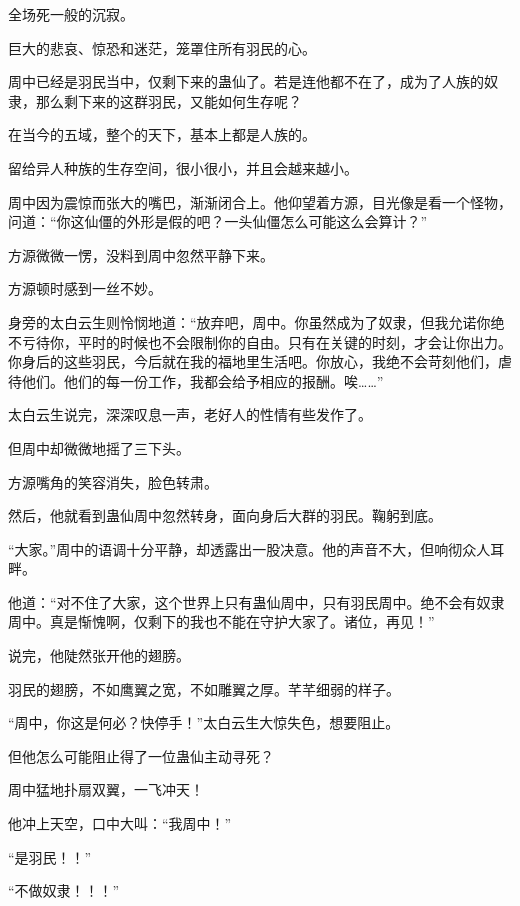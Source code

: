 
\begin{this_body}

全场死一般的沉寂。

巨大的悲哀、惊恐和迷茫，笼罩住所有羽民的心。

周中已经是羽民当中，仅剩下来的蛊仙了。若是连他都不在了，成为了人族的奴隶，那么剩下来的这群羽民，又能如何生存呢？

在当今的五域，整个的天下，基本上都是人族的。

留给异人种族的生存空间，很小很小，并且会越来越小。

周中因为震惊而张大的嘴巴，渐渐闭合上。他仰望着方源，目光像是看一个怪物，问道：“你这仙僵的外形是假的吧？一头仙僵怎么可能这么会算计？”

方源微微一愣，没料到周中忽然平静下来。

方源顿时感到一丝不妙。

身旁的太白云生则怜悯地道：“放弃吧，周中。你虽然成为了奴隶，但我允诺你绝不亏待你，平时的时候也不会限制你的自由。只有在关键的时刻，才会让你出力。你身后的这些羽民，今后就在我的福地里生活吧。你放心，我绝不会苛刻他们，虐待他们。他们的每一份工作，我都会给予相应的报酬。唉……”

太白云生说完，深深叹息一声，老好人的性情有些发作了。

但周中却微微地摇了三下头。

方源嘴角的笑容消失，脸色转肃。

然后，他就看到蛊仙周中忽然转身，面向身后大群的羽民。鞠躬到底。

“大家。”周中的语调十分平静，却透露出一股决意。他的声音不大，但响彻众人耳畔。

他道：“对不住了大家，这个世界上只有蛊仙周中，只有羽民周中。绝不会有奴隶周中。真是惭愧啊，仅剩下的我也不能在守护大家了。诸位，再见！”

说完，他陡然张开他的翅膀。

羽民的翅膀，不如鹰翼之宽，不如雕翼之厚。芊芊细弱的样子。

“周中，你这是何必？快停手！”太白云生大惊失色，想要阻止。

但他怎么可能阻止得了一位蛊仙主动寻死？

周中猛地扑扇双翼，一飞冲天！

他冲上天空，口中大叫：“我周中！”

“是羽民！！”

“不做奴隶！！！”


\end{this_body}
